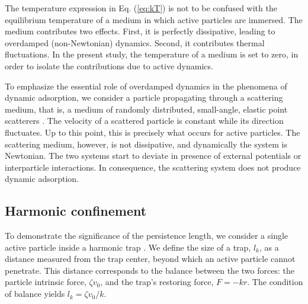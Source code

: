 \documentclass[pre,twocolumn,graphicx]{revtex4-1}
\begin{document}
The temperature expression in Eq. (\ref{eq:kT}) is not to be confused with the equilibrium temperature of 
a medium in which active particles are immersed.  The medium contributes two effects.  First, it is perfectly 
dissipative, leading to overdamped (non-Newtonian) dynamics.  Second, it contributes thermal fluctuations.  
In the present study, the temperature of a medium is set to zero, in order to isolate the contributions due to 
active dynamics. 

To emphasize the essential role of overdamped dynamics in the phenomena of dynamic adsorption, we 
consider a particle propagating through a scattering medium, that is, a medium of randomly distributed, 
small-angle, elastic point scatterers  \cite{Fisch80}. The velocity of a scattered particle is constant while its 
direction fluctuates. Up to this point, this is precisely what occurs for active particles. The scattering medium, 
however, is not dissipative, and dynamically the system is Newtonian.  The two systems start to deviate in 
presence of external potentials or interparticle interactions. In consequence, the scattering system does not 
produce dynamic adsorption. 




\subsection{Harmonic confinement}
To demonstrate the significance of the persistence length, we consider a single active particle inside 
a harmonic trap \cite{Brady16}.  
We define the size of a trap, $l_k$, as a distance measured from the trap center, beyond which an active particle cannot 
penetrate.  This distance corresponds to the balance between the two forces:  
the particle intrinsic force, $\zeta v_0$, and the trap's 
restoring force, $F=-kr$.  The condition of balance yields $l_k=\zeta v_0/k$.  
\end{document}
